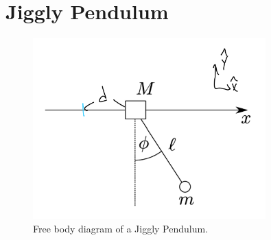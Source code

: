 \documentclass{article}
\numberwithin{equation}{section}
\begin{document}
\section{Jiggly Pendulum}

\begin{figure}[htp]
    \centering
    \includegraphics[width=0.8\textwidth]{Q3_fig.png} %
    \caption{Free body diagram of a Jiggly Pendulum. }
    \label{fig:example}
\end{figure}
\end{document}
